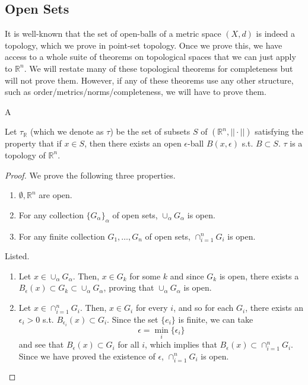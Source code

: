 \documentclass{article}
\begin{document}
  \subsection{Open Sets} 

    It is well-known that the set of open-balls of a metric space $(X, d)$ is indeed a topology, which we prove in point-set topology. Once we prove this, we have access to a whole suite of theorems on topological spaces that we can just apply to $\mathbb{R}^n$. We will restate many of these topological theorems for completeness but will not prove them. However, if any of these theorems use any other structure, such as order/metrics/norms/completeness, we will have to prove them. 

    \begin{definition}[Topology]
      A 
    \end{definition}

    \begin{theorem}
      Let $\tau_{\mathbb{R}}$ (which we denote as $\tau$) be the set of subsets $S$ of $(\mathbb{R}^n, || \cdot ||)$ satisfying the property that if $x \in S$, then there exists an open $\epsilon$-ball $B(x, \epsilon)$ s.t. $B \subset S$. $\tau$ is a topology of $\mathbb{R}^n$. 
    \end{theorem} 
    \begin{proof} 
      We prove the following three properties. 
      \begin{enumerate}
        \item $\emptyset, \mathbb{R}^n$ are open. 
        \item For any collection $\{G_\alpha\}_\alpha$ of open sets, $\cup_\alpha G_\alpha$ is open.  
        \item For any finite collection $G_1, \ldots, G_n$ of open sets, $\cap_{i=1}^n G_i$ is open. 
      \end{enumerate}
      Listed. 
      \begin{enumerate}
        \item Let $x \in \cup_\alpha G_\alpha$. Then, $x \in G_k$ for some $k$ and since $G_k$ is open, there exists a $B_\epsilon (x) \subset G_k \subset \cup_{\alpha} G_\alpha$, proving that $\cup_\alpha G_\alpha$ is open. 
        \item Let $x \in \cap_{i=1}^n G_i$. Then, $x \in G_i$ for every $i$, and so for each $G_i$, there exists an $\epsilon_i > 0$ s.t. $B_{\epsilon_i} (x) \subset G_i$. Since the set $\{e_i\}$ is finite, we can take 
        \[\epsilon = \min_i \{\epsilon_i\}\]
        and see that $B_\epsilon (x) \subset G_i$ for all $i$, which implies that $B_\epsilon (x) \subset \cap_{i=1}^n G_i$. Since we have proved the existence of $\epsilon$, $\cap_{i=1}^n G_i$ is open. 
      \end{enumerate}
    \end{proof}
\end{document}
